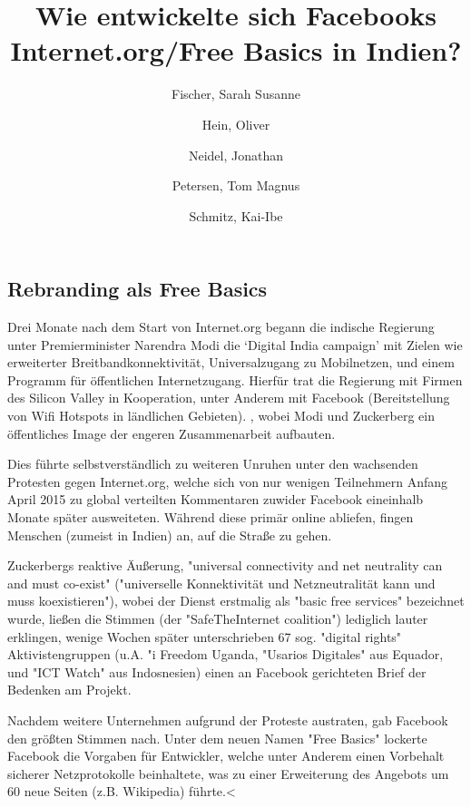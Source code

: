 \documentclass{article}
\title{Wie entwickelte sich Facebooks Internet.org/Free Basics in Indien?}
\author{
  Fischer, Sarah Susanne\\
  \and
  Hein, Oliver\\
  \and
  Neidel, Jonathan\\
  \and
  Petersen, Tom Magnus\\
  \and
  Schmitz, Kai-Ibe\\
}
\begin{document}
\maketitle

\subsection{Rebranding als Free Basics}

Drei Monate nach dem Start von Internet.org begann die indische Regierung unter Premierminister Narendra Modi die `Digital India campaign' mit Zielen wie erweiterter Breitbandkonnektivität, Universalzugang zu Mobilnetzen, und einem Programm für öffentlichen Internetzugang. %
Hierfür trat die Regierung mit Firmen des Silicon Valley in Kooperation, unter Anderem mit Facebook (Bereitstellung von Wifi Hotspots in ländlichen Gebieten).%
, wobei Modi und Zuckerberg ein öffentliches Image der engeren Zusammenarbeit aufbauten.

\medskip

Dies führte selbstverständlich zu weiteren Unruhen unter den wachsenden Protesten gegen Internet.org, welche sich von nur wenigen Teilnehmern Anfang April 2015 zu global verteilten Kommentaren zuwider Facebook eineinhalb Monate später ausweiteten. %
Während diese primär online abliefen, fingen Menschen (zumeist in Indien) an, auf die Straße zu gehen.

\medskip

Zuckerbergs reaktive Äußerung, "universal connectivity and net neutrality can and must co-exist" ("universelle Konnektivität und Netzneutralität kann und muss koexistieren"), wobei der Dienst erstmalig als "basic free services" bezeichnet wurde, ließen die Stimmen (der "SafeTheInternet coalition") lediglich lauter erklingen, wenige Wochen später unterschrieben 67 sog. "digital rights" Aktivistengruppen (u.A. "i Freedom Uganda, "Usarios Digitales" aus Equador, und "ICT Watch" aus Indosnesien) einen an Facebook gerichteten Brief der Bedenken am Projekt.

\medskip
\medskip

Nachdem weitere Unternehmen aufgrund der Proteste austraten, gab Facebook den größten Stimmen nach. Unter dem neuen Namen "Free Basics" lockerte Facebook die Vorgaben für Entwickler, welche unter Anderem einen Vorbehalt sicherer Netzprotokolle beinhaltete, was zu einer Erweiterung des Angebots um 60 neue Seiten (z.B. Wikipedia) führte.<

\medskip

\end{document}
